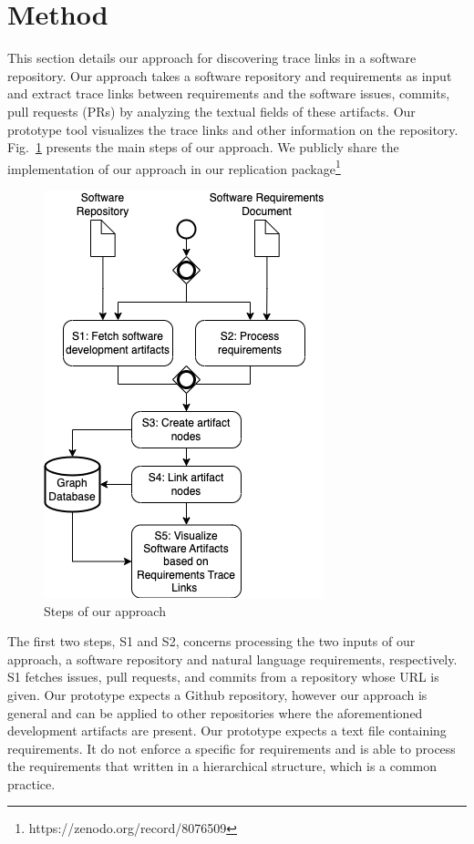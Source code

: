 \section{Method}
\label{sec:approach}

This section details our approach for discovering trace links in a software repository. Our approach takes a software repository and requirements as input and extract trace links between requirements and the software issues, commits, pull requests (PRs) by analyzing the textual fields of these artifacts. Our prototype tool visualizes the trace links and other information on the repository. Fig.~\ref{fig:sys-flow} presents the main steps of our approach. We publicly share the implementation of our approach in our replication package\footnote{https://zenodo.org/record/8076509}

\begin{figure}[htb]
    \centering
    \includegraphics[width=0.65\linewidth]{figs/approach.png}
    \caption{Steps of our approach}
    \label{fig:sys-flow}
  \end{figure}

  The first two steps, \textsf{S1} and \textsf{S2}, concerns processing the two inputs of our approach, a software repository and natural language requirements, respectively. \textsf{S1} fetches issues, pull requests, and commits from a repository whose URL is given. Our prototype expects a Github repository, however our approach is general and can be applied to other repositories where the aforementioned development artifacts are present. %
  Our prototype expects a text file containing requirements. It do not enforce a specific for requirements and is able to process the requirements that written in a hierarchical structure, which is a common practice.

